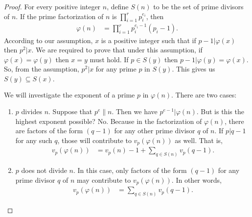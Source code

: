 \documentclass[main.tex]{subfile}
\begin{document}
		\begin{proof}
			For every positive integer $n$, define $S(n)$ to be the set of prime divisors of $n$. If the prime factorization of $n$ is $\prod_{i=1}^{r}p_i^{e_i}$, then
				\begin{align*}
					\varphi(n) & = \prod_{i=1}^{r}p_i^{e_i-1}(p_i-1).
				\end{align*}
			According to our assumption, $x$ is a positive integer such that if $p-1|\varphi(x)$ then $p^2|x$. We are required to prove that under this assumption, if $\varphi(x)=\varphi(y)$ then $x=y$ must hold. If $p\in S(y)$ then $p-1|\varphi(y)=\varphi(x)$. So, from the assumption, $p^2|x$ for any prime $p$ in $S(y)$. This gives us $S(y)\subseteq S(x)$.

			We will investigate the exponent of a prime $p$ in $\varphi(n)$. There are two cases:
				\begin{enumerate}
					\item $p$ divides $n$. Suppose that $p^e\|n$. Then we have $p^{e-1}|\varphi(n)$. But is this the highest exponent possible? No. Because in the factorization of $\varphi(n)$, there are factors of the form $(q-1)$ for any other prime divisor $q$ of $n$. If $p|q-1$ for any such $q$, those will contribute to $v_p(\varphi(n))$ as well. That is,
						\begin{align*}
							v_p(\varphi(n)) & = v_p(n)-1+\sum_{q\in S(n)}v_p(q-1).
						\end{align*}

					\item $p$ does not divide $n$. In this case, only factors of the form $(q-1)$ for any prime divisor $q$ of $n$ may contribute to $v_p(\varphi(n))$. In other words,
						\begin{align*}
							v_p(\varphi(n)) & = \sum_{q\in S(n)}v_p(q-1).
						\end{align*}
				\end{enumerate}


\end{proof}
\end{document}
